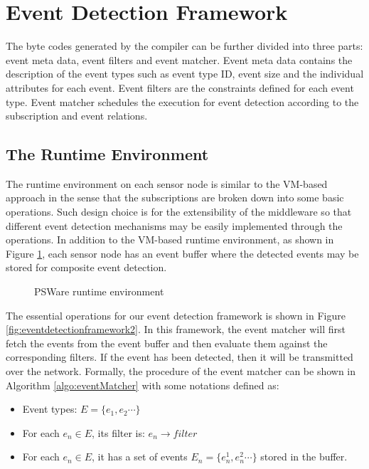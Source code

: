 \section{Event Detection Framework}
The byte codes generated by the compiler can be further divided into three parts: event meta data, event filters and event matcher. Event meta data contains the description of the event types such as event type ID, event size and the individual attributes for each event. Event filters are the constraints defined for each event type. Event matcher schedules the execution for event detection according to the subscription and event relations.

\subsection{The Runtime Environment}
The runtime environment on each sensor node is similar to the VM-based approach \cite{mate} in the sense that the subscriptions are broken down into some basic operations. Such design choice is for the extensibility of the middleware so that different event detection mechanisms may be easily implemented through the operations. In addition to the VM-based runtime environment, as shown in Figure \ref{fig:pswarevm}, each sensor node has an event buffer where the detected events may be stored for composite event detection.

\begin{figure}
\centering
{}
\caption{PSWare runtime environment}
\label{fig:pswarevm}
\end{figure}

The essential operations for our event detection framework is shown in Figure \ref{fig:eventdetectionframework2}. In this framework, the event matcher will first fetch the events from the event buffer and then evaluate them against the corresponding filters. If the event has been detected, then it will be transmitted over the network. Formally, the procedure of the event matcher can be shown in Algorithm \ref{algo:eventMatcher} with some notations defined as:
\begin{itemize}
\item Event types: \(E=\{e_1, e_2 \cdots \}\)
\item For each \(e_n\in E\), its filter is: \(e_n\rightarrow filter\)
\item For each \(e_n\in E\), it has a set of events \(E_n=\{e_n^1, e_n^2 \cdots \}\) stored in the buffer.
\end{itemize}

